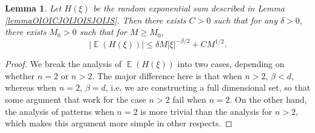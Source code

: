 \documentclass[dvipsnames,letterpaper,12pt]{article}
\numberwithin{equation}{section}
\DeclareMathOperator{\TT}{\mathbb{T}}
\newtheorem{lemma}[theorem]{Lemma}
\numberwithin{theorem}{section}
\DeclareMathOperator{\EE}{\mathbb{E}}
\DeclareMathOperator{\PP}{\mathbb{P}}
\begin{document}
\begin{lemma} \label{lemmaOIJIOCJSOIJSIOJ123}
    Let $H(\xi)$ be the random exponential sum described in Lemma \ref{lemmaOIOICJOIJOISJOIJS}. Then there exists $C > 0$ such that for any $\delta > 0$, there exists $M_0 > 0$ such that for $M \geq M_0$,
    \[ |\EE(H(\xi))| \leq \delta M |\xi|^{-\beta/2} + C M^{1/2}. \]
\end{lemma}
\begin{proof}
    We break the analysis of $\EE(H(\xi))$ into two cases, depending on whether $n = 2$ or $n > 2$. The major difference here is that when $n > 2$, $\beta < d$, whereas when $n = 2$, $\beta = d$, i.e.  we are constructing a full dimensional set,  so that some argument that work for the case $n > 2$ fail when $n = 2$. On the other hand, the analysis of patterns when $n = 2$ is more trivial than the analysis for $n > 2$, which makes this argument more simple in other respects.
%
%
%
%


\end{proof}
\end{document}
